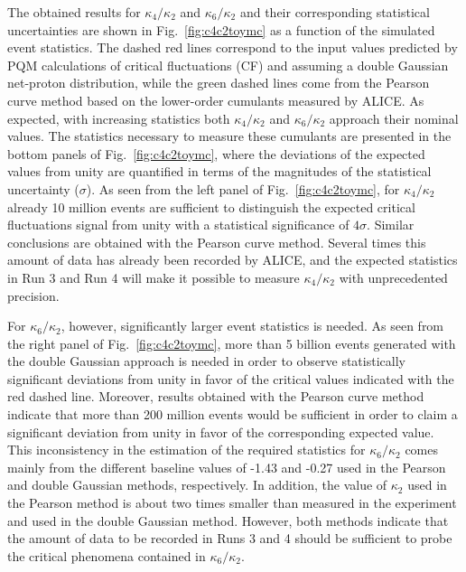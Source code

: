 The obtained results for $\kappa_{4}/\kappa_{2}$ and $\kappa_{6}/\kappa_{2}$ and their corresponding statistical uncertainties are shown in Fig.~\ref{fig:c4c2toymc} as a function of the simulated event statistics. The dashed red lines correspond to the input values predicted by PQM calculations of critical fluctuations (CF) and assuming a double Gaussian net-proton distribution, while the green dashed lines come from the Pearson curve method based on the lower-order cumulants measured by ALICE. As expected, with increasing statistics both $\kappa_{4}/\kappa_{2}$ and $\kappa_{6}/\kappa_{2}$ approach their nominal values. The statistics necessary to measure these cumulants are presented in the bottom panels of Fig.~\ref{fig:c4c2toymc}, where the deviations of the expected values from unity are quantified in terms of the magnitudes of the statistical uncertainty ($\sigma$). As seen from the left panel of Fig.~\ref{fig:c4c2toymc}, for $\kappa_{4}/\kappa_{2}$ already 10 million events are sufficient to distinguish the expected critical fluctuations signal from unity with a statistical significance of $4\sigma$. Similar conclusions are obtained with the Pearson curve method.  Several times this amount of data has already been recorded by ALICE, and the expected statistics in Run 3 and Run 4 will make it possible to measure  $\kappa_{4}/\kappa_{2}$ with unprecedented precision.  

For $\kappa_{6}/\kappa_{2}$, however, significantly larger event statistics is needed. As seen from the right panel of Fig.~\ref{fig:c4c2toymc}, more than 5 billion events generated with the double Gaussian approach is needed in order to observe statistically significant deviations from unity in favor of the critical values indicated with the red dashed line. Moreover, results obtained with the Pearson curve method indicate that more than 200 million events would be sufficient in order to claim a significant deviation from unity in favor of the corresponding expected value. This inconsistency in the estimation of the required statistics for $\kappa_{6}/\kappa_{2}$ comes mainly from the different baseline values of -1.43 and -0.27 used in the Pearson and double Gaussian methods, respectively. In addition, the value of $\kappa_{2}$ used in the Pearson method is about two times smaller than measured in the experiment and used in the double Gaussian method. However, both methods indicate that the amount of data to be recorded in Runs 3 and 4 should be sufficient to probe the critical phenomena contained in $\kappa_{6}/\kappa_{2}$. 
      
